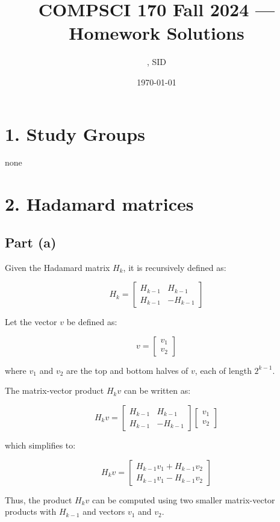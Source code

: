 \documentclass[11pt]{article}
\title{COMPSCI 170 Fall 2024 --- Homework \Homework Solutions}
\author{\Name, SID \SID}
\date{\today}
\begin{document}
\maketitle

\section*{1. Study Groups}

none

\newpage
\section*{2. Hadamard matrices}
\subsection*{Part (a)}
Given the Hadamard matrix \( H_k \), it is recursively defined as:

\[
H_k = \begin{bmatrix} 
H_{k-1} & H_{k-1} \\
H_{k-1} & -H_{k-1}
\end{bmatrix}
\]

Let the vector \( v \) be defined as:

\[
v = \begin{bmatrix} v_1 \\ v_2 \end{bmatrix}
\]

where \( v_1 \) and \( v_2 \) are the top and bottom halves of \( v \), each of length \( 2^{k-1} \).

The matrix-vector product \( H_k v \) can be written as:

\[
H_k v = \begin{bmatrix} H_{k-1} & H_{k-1} \\ H_{k-1} & -H_{k-1} \end{bmatrix} \begin{bmatrix} v_1 \\ v_2 \end{bmatrix}
\]

which simplifies to:

\[
H_k v = \begin{bmatrix} H_{k-1} v_1 + H_{k-1} v_2 \\ H_{k-1} v_1 - H_{k-1} v_2 \end{bmatrix}
\]

Thus, the product \( H_k v \) can be computed using two smaller matrix-vector products with \( H_{k-1} \) and vectors \( v_1 \) and \( v_2 \).
\end{document}
